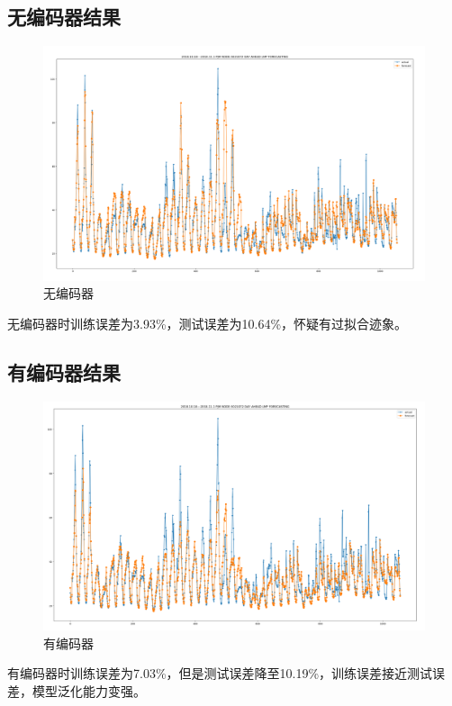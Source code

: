 \documentclass[UTF-8, 10pt]{ctexart}
\begin{document}
                \subsection{无编码器结果}
                \begin{figure}[H]                                        %
                    \centering                                                      %
                    \includegraphics[width = 1\textwidth]{noencoder.png}            %
                    \caption{无编码器}\label{1}                               %
                    \end{figure}   
                
                \indent{}无编码器时训练误差为3.93\%，测试误差为10.64\%，怀疑有过拟合迹象。\\

                \subsection{有编码器结果}
                \begin{figure}[H]                                        %
                    \centering                                                      %
                    \includegraphics[width = 1\textwidth]{hasencoder.png}            %
                    \caption{有编码器}\label{1}                               %
                    \end{figure}
                \indent{}有编码器时训练误差为7.03\%，但是测试误差降至10.19\%，训练误差接近测试误差，模型泛化能力变强。\\
\end{document}
